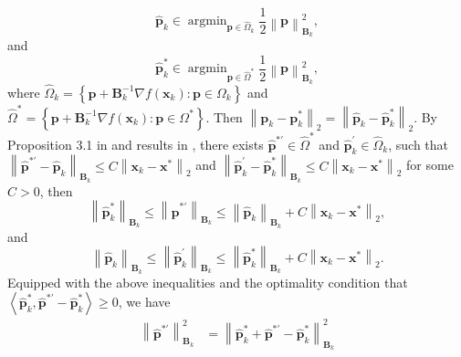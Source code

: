 \documentclass[aos]{imsart}
\numberwithin{equation}{section}
\theoremstyle{plain}
\begin{document}
\begin{appendix}
    \begin{equation*}
        \hat{\bm{p}}_{k} \in \mathop{\arg \min}_{\bm{p} \in \widehat{\Omega}_{k}} \frac{1}{2}\left\| \bm{p} \right\|_{\bm{B}_k}^2,
    \end{equation*}
    and
    \begin{equation*}
        \hat{\bm{p}}_{k}^{*} \in \mathop{\arg \min}_{\bm{p} \in \widehat{\Omega}^{*}} \frac{1}{2}\left\| \bm{p} \right\|_{\bm{B}_k}^2,
    \end{equation*}
    where $\widehat{\Omega}_{k} = \left\{\bm{p} + \bm{B}_{k}^{-1} \nabla f(\bm{x}_{k}): \bm{p} \in \Omega_{k} \right\}$ and  $\widehat{\Omega}^{*} = \left \{\bm{p} + \bm{B}_{k}^{-1} \nabla f(\bm{x}_{k}): \bm{p} \in \Omega^{*} \right\}$. Then $\left \| \bm{p}_{k} - \bm{p}_{k}^{*} \right\|_2 = \left \| \hat{\bm{p}}_{k} - \hat{\bm{p}}_{k}^{*} \right\|_2$. By Proposition 3.1 in \cite{daniel1973stability} and results in \cite{hoffman2003approximate}, there exists $\hat{\bm{p}}^{* \prime} \in \widehat{\Omega}^{*}$ and $\hat{\bm{p}}_{k}^{\prime} \in \widehat{\Omega}_{k}$, such that $\left\| \hat{\bm{p}}^{* \prime} - \hat{\bm{p}}_{k}  \right\|_{\bm{B}_k} \leq C \left\| \bm{x}_{k} - \bm{x}^{*} \right\|_2$ and $\left\| \hat{\bm{p}}_{k}^{\prime} - \hat{\bm{p}}_{k}^{*}  \right\|_{\bm{B}_k} \leq C \left\| \bm{x}_{k} - \bm{x}^{*} \right\|_2$ for some $C >0$, then 
    \begin{equation*}
        \left\|  \hat{\bm{p}}_{k}^{*} \right\|_{\bm{B}_{k}} \leq \left\| \hat{\bm{p}}^{* \prime} \right\|_{\bm{B}_k} \leq \left\| \hat{\bm{p}}_{k}  \right\|_{\bm{B}_k} + C  \left\| \bm{x}_{k} - \bm{x}^{*} \right\|_2,
    \end{equation*}
   and
    \begin{equation*}
        \left\|  \hat{\bm{p}}_{k}  \right\|_{\bm{B}_{k}} \leq \left\| \hat{\bm{p}}_{k}^{\prime} \right\|_{\bm{B}_k} \leq \left\| \hat{\bm{p}}_{k}^{*}  \right\|_{\bm{B}_k} + C  \left\| \bm{x}_{k} - \bm{x}^{*} \right\|_2.
    \end{equation*}
    Equipped with the above inequalities and the optimality condition that $\left\langle  \hat{\bm{p}}_{k}^{*}, \hat{\bm{p}}^{* \prime} -  \hat{\bm{p}}_{k}^{*} \right \rangle \geq 0$, we have 
    \begin{equation*}
        \begin{split}
            \left\| \hat{\bm{p}}^{* \prime} \right\|_{\bm{B}_{k}}^2 & =  \left\|  \hat{\bm{p}}_{k}^{*}  + \hat{\bm{p}}^{* \prime} - \hat{\bm{p}}_{k}^{*} \right\|_{\bm{B}_{k}}^2 \\

\end{split}
\end{equation*}
\end{appendix}
\end{document}
